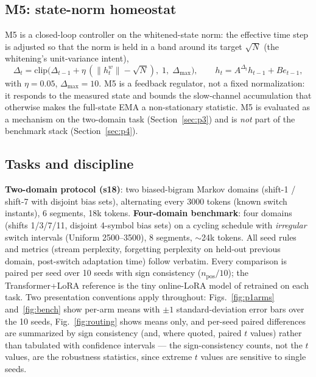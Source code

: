 \documentclass[preprint,12pt]{elsarticle}
\begin{document}
\subsection{M5: state-norm homeostat}
\label{sec:m5}

M5 is a closed-loop controller on the whitened-state norm: the effective
time step is adjusted so that the norm is held in a band around its
target $\sqrt{N}$ (the whitening's unit-variance intent),
\begin{equation}
\Delta_t = \mathrm{clip}\big(\Delta_{t-1} + \eta\,(\|h^w_t\| - \sqrt{N}),
\; 1,\; \Delta_{\max}\big), \qquad
h_t = A^{\Delta_t} h_{t-1} + B e_{t-1},
\label{eq:m5}
\end{equation}
with $\eta = 0.05$, $\Delta_{\max} = 10$. M5 is a feedback regulator,
not a fixed normalization: it responds to the measured state and bounds
the slow-channel accumulation that otherwise makes the full-state EMA a
non-stationary statistic. M5 is evaluated as a mechanism on the
two-domain task (Section~\ref{sec:p3}) and is \emph{not} part of the
benchmark stack (Section~\ref{sec:p4}).

\subsection{Tasks and discipline}
\label{sec:tasks}

{\sloppy
\textbf{Two-domain protocol (s18)}: two biased-bigram Markov domains
(shift-1 / shift-7 with disjoint bias sets), alternating every 3000
tokens (known switch instants), 6 segments, 18k tokens. \textbf{Four-domain
benchmark}: four domains (shifts 1/3/7/11, disjoint 4-symbol
bias sets) on a cycling schedule with \emph{irregular} switch intervals
(Uniform 2500--3500), 8 segments, $\sim$24k tokens. All seed rules and
metrics (stream perplexity, forgetting perplexity on held-out previous
domain, post-switch adaptation time) follow \cite{redemc} verbatim.
Every comparison is paired per seed over 10 seeds with sign consistency
($n_{\mathrm{pos}}/10$); the Transformer+LoRA reference is the tiny
online-LoRA model of \cite{redemc} retrained on each task. Two
presentation conventions apply throughout: Figs.~\ref{fig:p1arms}
and~\ref{fig:bench} show per-arm means with $\pm1$ standard-deviation
error bars over the 10 seeds, Fig.~\ref{fig:routing} shows means only,
and per-seed paired differences are
summarized by sign consistency (and, where quoted, paired $t$ values)
rather than tabulated with confidence intervals --- the
sign-consistency counts, not the $t$ values, are the robustness
statistics, since extreme $t$ values are sensitive to single seeds.\par}
\end{document}
